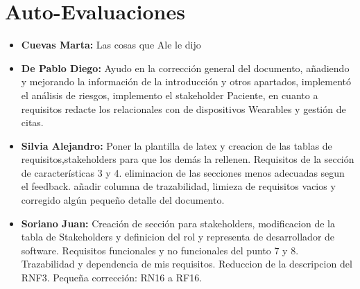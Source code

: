 \documentclass{article}
\begin{document}
\section{Auto-Evaluaciones}
\begin{itemize}
	\item \textbf{Cuevas Marta:} Las cosas que Ale le dijo
	\item \textbf{De Pablo Diego:} Ayudo en la corrección general del documento, añadiendo y mejorando la información de la introducción y otros apartados, implementó el análisis de riesgos, implemento el stakeholder Paciente, en cuanto a requisitos  redacte los relacionales con de dispositivos Wearables y gestión de citas.
	\item \textbf{Silvia Alejandro:} Poner la plantilla de latex y creacion de las tablas de requisitos,stakeholders para que los demás la rellenen. Requisitos de la sección de características 3 y 4. eliminacion de las secciones menos adecuadas segun el feedback. añadir columna de trazabilidad, limieza de requisitos vacios y corregido algún pequeño detalle del documento.
	\item \textbf{Soriano Juan:} Creación de sección para stakeholders, modificacion de la tabla de Stakeholders y definicion del rol y representa de desarrollador de software. Requisitos funcionales y no funcionales del punto 7 y 8. Trazabilidad y dependencia de mis requisitos. Reduccion de la descripcion del RNF3. Pequeña corrección: RN16 a RF16.
\end{itemize}
\end{document}
